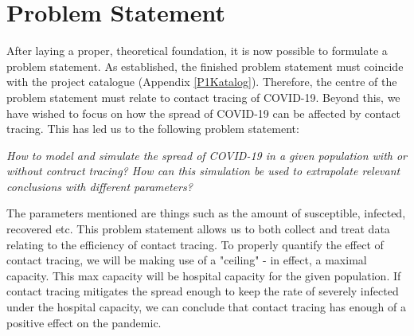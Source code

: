 \section{Problem Statement} \label{sec: Problem Statement}
After laying a proper, theoretical foundation, it is now possible to formulate a problem statement. As established, the finished problem statement must coincide with the project catalogue (Appendix \ref{P1Katalog}). Therefore, the centre of the problem statement must relate to contact tracing of COVID-19. Beyond this, we have wished to focus on how the spread of COVID-19 can be affected by contact tracing. This has led us to the following problem statement:

\begin{center}
    \textit{How to model and simulate the spread of COVID-19 in a given population with or without contract tracing? 
How can this simulation be used to extrapolate relevant conclusions with different parameters?}
\end{center}

The parameters mentioned are things such as the amount of susceptible, infected, recovered etc. This problem statement allows us to both collect and treat data relating to the efficiency of contact tracing. To properly quantify the effect of contact tracing, we will be making use of a "ceiling" - in effect, a maximal capacity. This max capacity will be hospital capacity for the given population. If contact tracing mitigates the spread enough to keep the rate of severely infected under the hospital capacity, we can conclude that contact tracing has enough of a positive effect on the pandemic.
